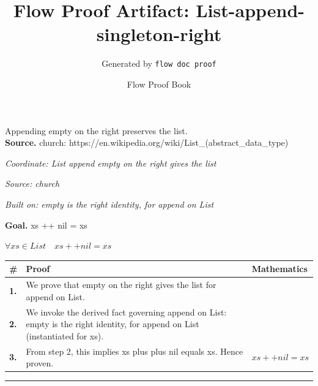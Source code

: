 \documentclass[11pt]{article}
\title{Flow Proof Artifact: List-append-singleton-right}
\author{Generated by \texttt{flow doc proof}}
\date{Flow Proof Book}
\theoremstyle{definition}
\begin{document}
\maketitle
Appending empty on the right preserves the list.\\[0.5em]
\textbf{Source.} church: https://en.wikipedia.org/wiki/List\_(abstract\_data\_type)\\[0.5em]
\bigskip
{}\par
\smallskip\noindent\textit{Coordinate: List \cdot append \cdot empty on the right gives the list}\par
\smallskip\noindent\textit{Source: church}\par
\smallskip\noindent\textit{Built on: empty is the right identity, for append on List}\par
\medskip
\noindent\textbf{Goal.} xs ++ nil = xs\par
\noindent$\displaystyle \forall xs \in List\quad xs ++ nil = xs$\par
\medskip
\noindent
\begin{tabular}{@{} >{\raggedright\arraybackslash}p{} >{\raggedright\arraybackslash}p{} >{\raggedleft\arraybackslash}p{} @{}}
\textbf{\#} & \textbf{Proof} & \textbf{Mathematics} \\
\midrule
\textbf{1.} & We prove that empty on the right gives the list for append on List. & \\[0.45em]
\textbf{2.} & We invoke the derived fact governing append on List: empty is the right identity, for append on List (instantiated for xs). & \\[0.45em]
\textbf{3.} & From step 2, this implies xs plus plus nil equals xs. Hence proven. & $\displaystyle xs ++ nil = xs$ \\[0.45em]
\bottomrule
\end{tabular}
\label{thm:List-append-empty_on_the_right_gives_the_list}
\par\medskip\hrule
\end{document}
